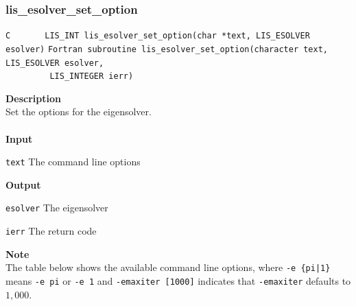 \documentclass[a4paper]{article}
\newcommand{\namelistlabel}[1]{\mbox{#1}\hfill}
\newenvironment{namelist}[1]{%
\begin{list}{}
  {\let\makelabel\namelistlabel
  \settowidth{\labelwidth}{#1}
  \setlength{\leftmargin}{1.1\labelwidth}}
  }{%
\end{list}}
\begin{document}
\newpage
\subsubsection{lis\_esolver\_set\_option}
  \label{sec:setoptions}
\begin{screen}
\verb|C       LIS_INT lis_esolver_set_option(char *text, LIS_ESOLVER esolver)|
\verb|Fortran subroutine lis_esolver_set_option(character text, LIS_ESOLVER esolver,|\\
\verb|         LIS_INTEGER ierr)|
\end{screen}
{\bf Description}\\
\indent
Set the options for the eigensolver.
\\ \\
\noindent
{\bf Input}
\begin{namelist}{XXXXXXXXXXXXXXXXXXXX}
\item[\tt text] The command line options
\end{namelist}
{\bf Output}
\begin{namelist}{XXXXXXXXXXXXXXXXXXXX}
\item[\tt esolver] The eigensolver
\item[\tt ierr] The return code
\end{namelist}
{\bf Note}\\
\indent
The table below shows the available command line options, 
where \verb=-e {pi|1}= means \verb=-e pi= or \verb=-e 1= and \verb=-emaxiter [1000]= indicates 
that \verb=-emaxiter= defaults to $1,000$.
\\
\\
\end{document}
